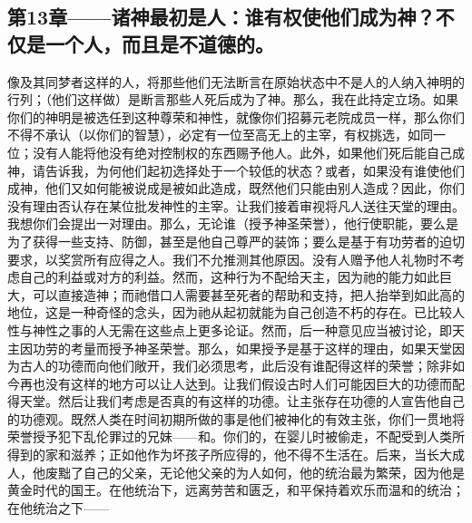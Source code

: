 
\subsection{第13章——诸神最初是人：谁有权使他们成为神？不仅是一个人，而且是不道德的。}

像及其同梦者这样的人，将那些他们无法断言在原始状态中不是人的人纳入神明的行列；（他们这样做）是断言那些人死后成为了神。那么，我在此持定立场。如果你们的神明是被选任到这种尊荣和神性，就像你们招募元老院成员一样，那么你们不得不承认（以你们的智慧），必定有一位至高无上的主宰，有权挑选，如同一位；没有人能将他没有绝对控制权的东西赐予他人。此外，如果他们死后能自己成神，请告诉我，为何他们起初选择处于一个较低的状态？或者，如果没有谁使他们成神，他们又如何能被说成是被如此造成，既然他们只能由别人造成？因此，你们没有理由否认存在某位批发神性的主宰。让我们接着审视将凡人送往天堂的理由。我想你们会提出一对理由。那么，无论谁（授予神圣荣誉），他行使职能，要么是为了获得一些支持、防御，甚至是他自己尊严的装饰；要么是基于有功劳者的迫切要求，以奖赏所有应得之人。我们不允推测其他原因。没有人赠予他人礼物时不考虑自己的利益或对方的利益。然而，这种行为不配给天主，因为祂的能力如此巨大，可以直接造神；而祂借口人需要甚至死者的帮助和支持，把人抬举到如此高的地位，这是一种奇怪的念头，因为祂从起初就能为自己创造不朽的存在。已比较人性与神性之事的人无需在这些点上更多论证。然而，后一种意见应当被讨论，即天主因功劳的考量而授予神圣荣誉。那么，如果授予是基于这样的理由，如果天堂因为古人的功德而向他们敞开，我们必须思考，此后没有谁配得这样的荣誉；除非如今再也没有这样的地方可以让人达到。让我们假设古时人们可能因巨大的功德而配得天堂。然后让我们考虑是否真的有这样的功德。让主张存在功德的人宣告他自己的功德观。既然人类在时间初期所做的事是他们被神化的有效主张，你们一贯地将荣誉授予犯下乱伦罪过的兄妹——和。你们的，在婴儿时被偷走，不配受到人类所得到的家和滋养；正如他作为坏孩子所应得的，他不得不生活在。后来，当长大成人，他废黜了自己的父亲，无论他父亲的为人如何，他的统治最为繁荣，因为他是黄金时代的国王。在他统治下，远离劳苦和匮乏，和平保持着欢乐而温和的统治；在他统治之下——\par

\newline{}\par

